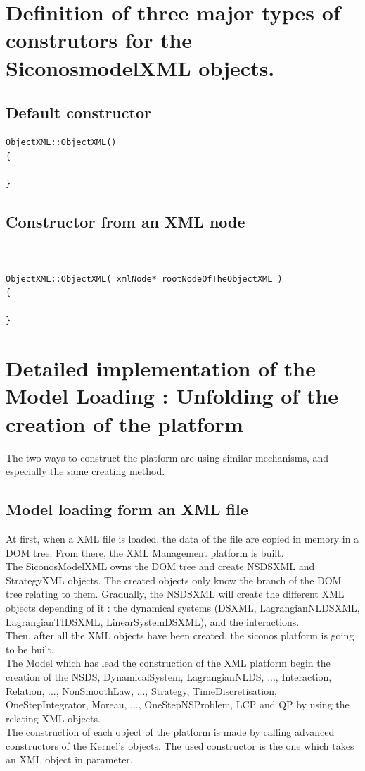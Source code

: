 \clearpage
\section{Definition of three major types of construtors for the SiconosmodelXML objects.}


\subsection{Default constructor}

\begin{verbatim}
ObjectXML::ObjectXML() 
{

}
\end{verbatim}



\subsection{Constructor from an XML node}


\begin{verbatim}


ObjectXML::ObjectXML( xmlNode* rootNodeOfTheObjectXML ) 
{

}
\end{verbatim}
\clearpage
\section{Detailed implementation of the Model Loading : Unfolding of the creation of the platform}
The two ways to construct the platform are using similar mechanisms, and especially the same creating
method.



\subsection{Model loading form an XML file}


At first, when a XML file is loaded, the data of the file are copied in memory in a DOM tree. From
there, the XML Management platform is built.\\
The SiconosModelXML owns the DOM tree and create NSDSXML and StrategyXML objects. The created objects
only know the branch of the DOM tree relating to them. Gradually, the NSDSXML will create the
different XML objects depending of it : the dynamical systems (DSXML, LagrangianNLDSXML, LagrangianTIDSXML,
LinearSystemDSXML), and the interactions.\\
Then, after all the XML objects have been created, the \ac{siconos} platform is going to be built.\\
The Model which has lead the construction of the XML platform begin the creation of the NSDS,
DynamicalSystem, LagrangianNLDS, ..., Interaction, Relation, ..., NonSmoothLaw, ..., Strategy,
TimeDiscretisation, OneStepIntegrator, Moreau, ..., OneStepNSProblem, LCP and QP by using the
relating XML objects.\\
The construction of each object of the platform is made by calling advanced constructors of the Kernel's objects. The used constructor is the one which takes an XML object in parameter.\\


